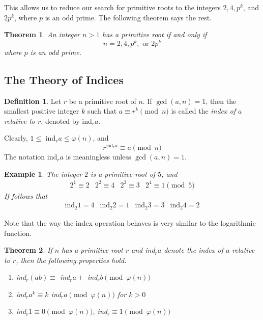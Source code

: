 \documentclass{article}
\newtheorem{theorem}{Theorem}[section]
\newtheorem{example}{Example}[section]
\theoremstyle{remark}
\theoremstyle{definition}
\newtheorem{definition}{Definition}[section]
\begin{document}
This allows us to reduce our search for primitive roots to the integers $2, 4, p^k$, and $2p^k$, where $p$ is an odd prime. The following theorem says the rest. 

\begin{theorem}
An integer $n>1$ has a primitive root if and only if 
\[n = 2, 4, p^k, \text{ or } 2p^k\]
where $p$ is an odd prime. 
\end{theorem}

\subsection{The Theory of Indices}

\begin{definition}
Let $r$ be a primitive root of $n$. If $\gcd(a, n) = 1$, then the smallest positive integer $k$ such that $a \equiv r^k \pmod{n}$ is called the \textit{index of $a$ relative to $r$}, denoted by ind$_r a$. 
\end{definition}

Clearly, $1 \leq$ ind$_r a \leq \varphi(n)$, and 
\[r^{\text{ind}_r a} \equiv a \pmod{n}\]
The notation ind$_r a$ is meaningless unless $\gcd(a, n) = 1$. 

\begin{example}
The integer $2$ is a primitive root of $5$, and 
\[\begin{array}{cccc}
    2^1 \equiv 2 & 2^2 \equiv 4 & 2^3 \equiv 3 & 2^4 \equiv 1 \pmod{5}
\end{array}\]
If follows that 
\[\begin{array}{cccc}
    \text{ind}_2 1 = 4 & \text{ind}_2 2 = 1 & \text{ind}_2 3 = 3 & \text{ind}_2 4 = 2
\end{array}\]
\end{example}
Note that the way the index operation behaves is very similar to the logarithmic function. 

\begin{theorem}
If $n$ has a primitive root $r$ and ind$_r a$ denote the index of $a$ relative to $r$, then the following properties hold. 
\begin{enumerate}
    \item ind$_r (a b) \equiv$ ind$_r a + $ ind$_r b \pmod{\varphi(n)}$
    \item ind$_r a^k \equiv k$ ind$_r a \pmod{\varphi(n)}$ for $k>0$ 
    \item ind$_r 1 \equiv 0 \pmod{\varphi(n)}$, ind$_r \equiv 1 \pmod{\varphi(n)}$
\end{enumerate}
\end{theorem}
\end{document}

